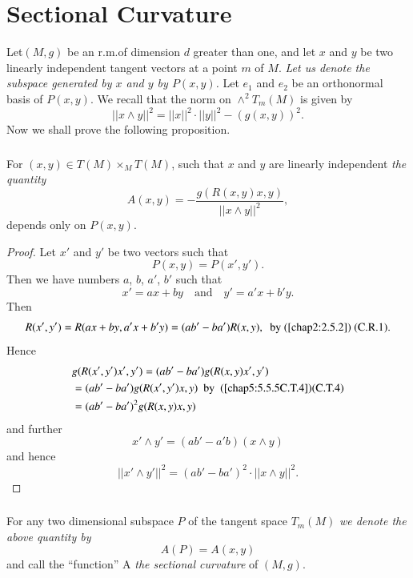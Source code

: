 \chapter{Sectional Curvature}\label{chap6:chap6}

Let\pageoriginale $(M,g)$ be an r.m.\@ of dimension $d$ greater than
one, and let $x$ and $y$ be two linearly independent tangent vectors
at a point $m$ of $M$. {\em Let us denote the subspace generated by
  $x$ and $y$ by $P(x,y)$.} Let $e_{1}$ and $e_{2}$ be an orthonormal
basis of $P(x,y)$. We recall that the norm on
${\displaystyle{\mathop{\wedge}^{2}}}T_{m}(M)$ is given by
$$
||x\wedge y||^{2}=||x||^{2}\cdot ||y||^{2}-(g(x,y))^{2}.
$$
Now we shall prove the following proposition.

\subsection{}\label{chap6:6.1.1}

\begin{prop*}
For $(x,y)\in T(M){\displaystyle{\mathop{\times}_{M}}}T(M)$, such that
$x$ and $y$ are linearly independent {\em the quantity}
\begin{equation*}
A(x,y)=-\dfrac{g(R(x,y)x,y)}{||x\wedge y||^{2}},\tag{6.1.2}\label{chap6:6.1.2}
\end{equation*}
depends only on $P(x,y)$.
\end{prop*}

\begin{proof}
Let $x'$ and $y'$ be two vectors such that
$$
P(x,y)=P(x',y').
$$
Then we have numbers $a$, $b$, $a'$, $b'$ such that
$$
x'=ax+by\quad\text{and}\quad y'=a'x+b'y.
$$
Then
$$
R(x',y')=R(ax+by, a'x+b'y)=(ab'-ba')R(x,y),\text{ \ by (\ref{chap2:2.5.2}) (C.R.1)}.
$$
Hence 
\begin{align*}
& g(R(x',y')x',y')=(ab'-ba')g(R(x,y)x',y')\\
& =(ab'-ba')g(R(x',y')x,y)\text{ \ by \ (\ref{chap5:5.5.5C.T.4})(C.T.4)}\\
&= (ab'-ba')^{2}g(R(x,y)x,y)
\end{align*}\pageoriginale
and further
$$
x' \wedge y'=(ab'-a'b)(x \wedge y)
$$
and hence
$$
||x' \wedge y'||^{2}=(ab'-ba')^{2}\cdot ||x \wedge y||^{2}.
$$
\end{proof}

\setcounter{subsection}{2}
\subsection{}\label{chap6:6.1.3}
For any two dimensional subspace $P$ of the tangent space $T_{m}(M)$
{\em we denote the above quantity by}
$$
A(P)=A(x,y)
$$
and call the ``function'' A {\em the sectional curvature} of $(M,g)$.

